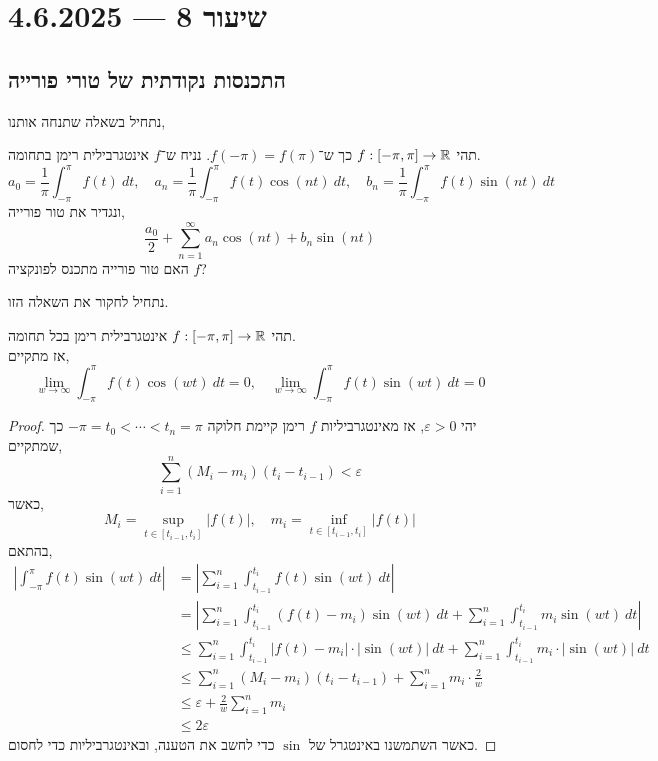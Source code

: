 \section{שיעור 8 --- 4.6.2025}

\subsection{התכנסות נקודתית של טורי פורייה}
נתחיל בשאלה שתנחה אותנו,
\begin{exercise}
	תהי $f : [-\pi, \pi] \to \mathbb{R}$ כך ש־$f(-\pi) = f(\pi)$.
	נניח ש־$f$ אינטגרבילית רימן בתחומה.
	\[
		a_0 = \frac{1}{\pi} \int_{-\pi}^{\pi} f(t)\ dt,
		\quad
		a_n = \frac{1}{\pi} \int_{-\pi}^{\pi} f(t) \cos(nt)\ dt,
		\quad
		b_n = \frac{1}{\pi} \int_{-\pi}^{\pi} f(t) \sin(nt)\ dt
	\]
	ונגדיר את טור פורייה,
	\[
		\frac{a_0}{2} + \sum_{n = 1}^\infty a_n \cos(nt) + b_n \sin(nt)
	\]
	האם טור פורייה מתכנס לפונקציה $f$?
\end{exercise}
נתחיל לחקור את השאלה הזו.
\begin{lemma}
	תהי $f : [-\pi, \pi] \to \mathbb{R}$ אינטגרבילית רימן בכל תחומה. \\
	אז מתקיים,
	\[
		\lim_{w \to \infty} \int_{-\pi}^{\pi} f(t) \cos(w t)\ dt = 0,
		\quad
		\lim_{w \to \infty} \int_{-\pi}^{\pi} f(t) \sin(w t)\ dt = 0
	\]
\end{lemma}
\begin{proof}
	יהי $\varepsilon > 0$, אז מאינטגרביליות $f$ רימן קיימת חלוקה $-\pi = t_0 < \cdots < t_n = \pi$ כך שמתקיים,
	\[
		\sum_{i = 1}^n (M_i - m_i) (t_i - t_{i - 1})
		< \varepsilon
	\]
	כאשר,
	\[
		M_i = \sup_{t \in [t_{i - 1}, t_i]} |f(t)|,
		\quad
		m_i = \inf_{t \in [t_{i - 1}, t_i]} |f(t)|
	\]
	בהתאם,
	\begin{align*}
		\left\lvert \int_{-\pi}^{\pi} f(t) \sin(wt)\ dt \right\rvert
		& = \left\lvert \sum_{i = 1}^n \int_{t_{i - 1}}^{t_i} f(t) \sin(wt)\ dt \right\rvert \\
		& = \left\lvert \sum_{i = 1}^n \int_{t_{i - 1}}^{t_i} (f(t) - m_i) \sin(wt)\ dt + \sum_{i = 1}^n \int_{t_{i - 1}}^{t_i} m_i \sin(wt)\ dt \right\rvert \\
		& \le \sum_{i = 1}^n \int_{t_{i - 1}}^{t_i} |f(t) - m_i| \cdot |\sin(wt)|\ dt + \sum_{i = 1}^n \int_{t_{i - 1}}^{t_i} m_i \cdot |\sin(wt)|\ dt  \\
		& \le \sum_{i = 1}^n (M_i - m_i) (t_i - t_{i - 1}) + \sum_{i = 1}^n m_i \cdot \frac{2}{w} \\
		& \le \varepsilon + \frac{2}{w} \sum_{i = 1}^n m_i \\
		& \le 2\varepsilon
	\end{align*}
	כאשר השתמשנו באינטגרל של $\sin$ כדי לחשב את הטענה, ובאינטגרביליות כדי לחסום.
\end{proof}
